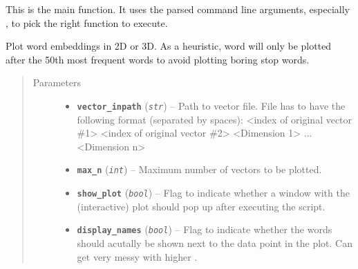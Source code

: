 \documentclass[letterpaper,10pt,english]{sphinxmanual}
\begin{document}

\begin{fulllineitems}
\label{src.eval:src.eval.eval_vectors.main}
This is the main function. It uses the parsed command line arguments, especially , to pick the right
function to execute.

\end{fulllineitems}


\begin{fulllineitems}
\label{src.eval:src.eval.eval_vectors.plot}
Plot word embeddings in 2D or 3D. As a heuristic, word will only be plotted after the 50th most frequent words to
avoid plotting boring stop words.
\begin{quote}\begin{description}
\item[{Parameters}] \leavevmode\begin{itemize}
\item {} 
\textbf{\texttt{vector\_inpath}} (\emph{\texttt{str}}) -- Path to vector file. File has to have the following format (separated by spaces):
\textless{}index of original vector \#1\textgreater{} \textless{}index of original vector \#2\textgreater{} \textless{}Dimension 1\textgreater{} ... \textless{}Dimension n\textgreater{}

\item {} 
\textbf{\texttt{max\_n}} (\emph{\texttt{int}}) -- Maximum number of vectors to be plotted.

\item {} 
\textbf{\texttt{show\_plot}} (\emph{\texttt{bool}}) -- Flag to indicate whether a window with the (interactive) plot should pop up after executing
the script.

\item {} 
\textbf{\texttt{display\_names}} (\emph{\texttt{bool}}) -- Flag to indicate whether the words should acutally be shown next to the data point in
the plot. Can get very messy with higher .

\end{itemize}

\end{description}\end{quote}

\end{fulllineitems}
\end{document}
